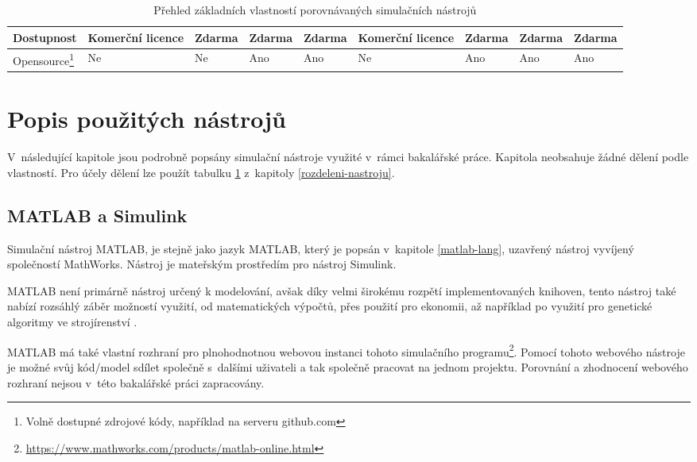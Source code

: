\begin{savenotes}
\begin{table}[]
{\begin{tabular}{|l|l|l|l|l|l|l|l|l|}
Dostupnost                                                                                          & Komerční licence & Zdarma     & Zdarma & Zdarma  & Komerční licence & Zdarma                                                   & Zdarma    & Zdarma         \\ \hline
Opensource\footnote{Volně dostupné zdrojové kódy, například na serveru github.com} & Ne                                                                                                              & Ne         & Ano    & Ano     & Ne               & Ano                                                      & Ano        & Ano            \\ \hline
\end{tabular}%
}
\caption{Přehled základních vlastností porovnávaných simulačních nástrojů}
\label{tab:rozdeleni-nastroju}
\end{table}
\end{savenotes}



\section{Popis použitých nástrojů}
\label{popis-nastroju}
V~následující kapitole jsou podrobně popsány simulační nástroje využité v~rámci bakalářské práce. Kapitola neobsahuje žádné dělení podle vlastností. Pro účely dělení lze použít tabulku \ref{tab:rozdeleni-nastroju} z~kapitoly \ref{rozdeleni-nastroju}.
\subsection{MATLAB a Simulink}
\label{matlab-desc}

Simulační nástroj MATLAB, je stejně jako jazyk MATLAB, který je popsán v~kapitole \ref{matlab-lang}, uzavřený nástroj vyvíjený společností MathWorks. Nástroj je mateřským prostředím pro nástroj Simulink.

MATLAB není primárně nástroj určený k modelování, avšak díky velmi širokému rozpětí implementovaných knihoven, tento nástroj také nabízí rozsáhlý záběr možností využití, od matematických výpočtů, přes použití pro ekonomii, až například po využití pro genetické algoritmy ve strojírenství \cite{Zapletal2016}.

MATLAB má také vlastní rozhraní pro plnohodnotnou webovou instanci tohoto simulačního programu\footnote{\url{https://www.mathworks.com/products/matlab-online.html}}. Pomocí tohoto webového nástroje je možné svůj kód/model sdílet společně s~dalšími uživateli a tak společně pracovat na jednom projektu. Porovnání a zhodnocení webového rozhraní nejsou v~této bakalářské práci zapracovány.


